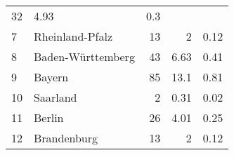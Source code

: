 \begin{longtable}{lXrrr}
       \num{32} &
       \num[round-mode=places,round-precision=2]{4,93} &
         \num[round-mode=places,round-precision=2]{0,3} \\

     7 &
     \multicolumn{1}{X}{ Rheinland-Pfalz   } &


       \num{13} &
       \num[round-mode=places,round-precision=2]{2} &
         \num[round-mode=places,round-precision=2]{0,12} \\

     8 &
     \multicolumn{1}{X}{ Baden-Württemberg   } &


       \num{43} &
       \num[round-mode=places,round-precision=2]{6,63} &
         \num[round-mode=places,round-precision=2]{0,41} \\

     9 &
     \multicolumn{1}{X}{ Bayern   } &


       \num{85} &
       \num[round-mode=places,round-precision=2]{13,1} &
         \num[round-mode=places,round-precision=2]{0,81} \\

     10 &
     \multicolumn{1}{X}{ Saarland   } &


       \num{2} &
       \num[round-mode=places,round-precision=2]{0,31} &
         \num[round-mode=places,round-precision=2]{0,02} \\

     11 &
     \multicolumn{1}{X}{ Berlin   } &


       \num{26} &
       \num[round-mode=places,round-precision=2]{4,01} &
         \num[round-mode=places,round-precision=2]{0,25} \\

     12 &
     \multicolumn{1}{X}{ Brandenburg   } &


       \num{13} &
       \num[round-mode=places,round-precision=2]{2} &
         \num[round-mode=places,round-precision=2]{0,12} \\


\end{longtable}
